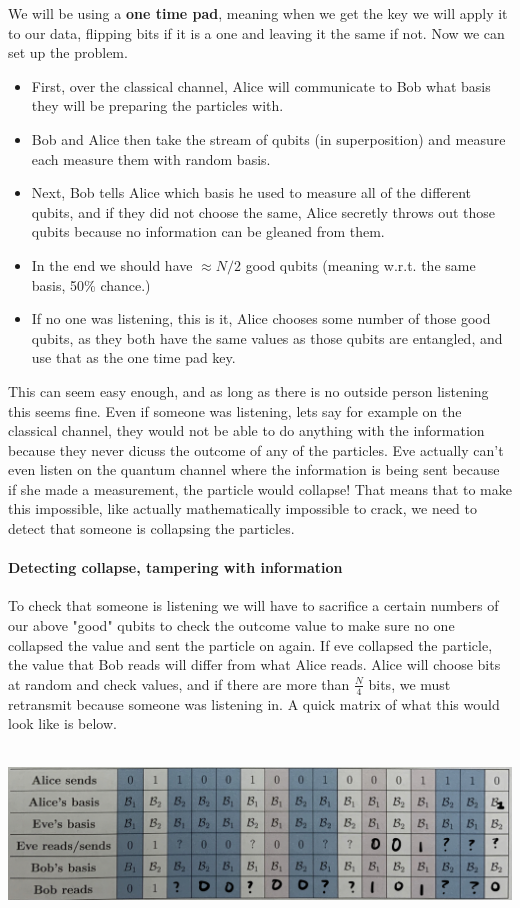 \documentclass[12pt]{article}
\theoremstyle{plain}
\theoremstyle{nonumberplain}
\theoremstyle{plain}
\theoremstyle{nonumberplain}
\newcommand\1{{\bf 1}}
\newcommand{\<}{\left\langle}
\renewcommand{\>}{\right\rangle}
\begin{document}
We will be using a \textbf{one time pad}, meaning when we get the key we will apply it to our data, flipping bits if it is a one and leaving it the same if not.  Now we can set up the problem.

\begin{itemize}
\item First, over the classical channel, Alice will communicate to Bob what basis they will be preparing the particles with.  
\item Bob and Alice then take the stream of qubits (in superposition) and measure each measure them with random basis.  
\item Next, Bob tells Alice which basis he used to measure all of the different qubits, and if they did not choose the same, Alice secretly throws out those qubits because no information can be gleaned from them.
\item In the end we should have $\approx N/2$ good qubits (meaning w.r.t. the same basis, 50\% chance.)
\item If no one was listening, this is it, Alice chooses some number of those good qubits, as they both have the same values as those qubits are entangled, and use that as the one time pad key.  
\end{itemize}
This can seem easy enough, and as long as there is no outside person listening this seems fine.  Even if someone was listening, lets say for example on the classical channel, they would not be able to do anything with the information because they never dicuss the outcome of any of the particles.  Eve actually can't even listen on the quantum channel where the information is being sent because if she made a measurement, the particle would collapse!  That means that to make this impossible, like actually mathematically impossible to crack, we need to detect that someone is collapsing the particles.

\paragraph{Detecting collapse, tampering with information}
To check that someone is listening we will have to sacrifice a certain numbers of our above "good" qubits to check the outcome value to make sure no one collapsed the value and sent the particle on again.  If eve collapsed the particle, the value that Bob reads will differ from what Alice reads.  Alice will choose bits at random and check values, and if there are more than $\frac{N}{4}$ bits, we must retransmit because someone was listening in.  A quick matrix of what this would look like is below.
\\
\\
\begin{center}
 \includegraphics[scale=.3]{eve}
\end{center}
\end{document}
